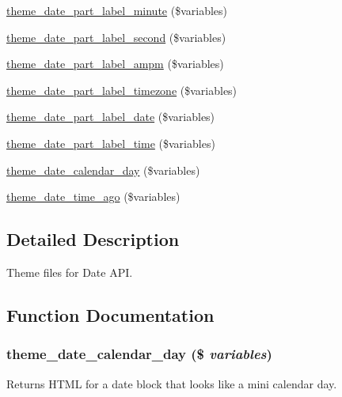 \begin{DoxyCompactItemize}
\item 
\hyperlink{date_2date__api_2theme_2theme_8inc_a20f7b09ea3d8c2ccba5a049d805a9aaf}{theme\_\-date\_\-part\_\-label\_\-minute} (\$variables)
\item 
\hyperlink{date_2date__api_2theme_2theme_8inc_a7419226ba21ee61300adf34a8643fdcf}{theme\_\-date\_\-part\_\-label\_\-second} (\$variables)
\item 
\hyperlink{date_2date__api_2theme_2theme_8inc_aaba84c834dc97a4061f1c671292c667a}{theme\_\-date\_\-part\_\-label\_\-ampm} (\$variables)
\item 
\hyperlink{date_2date__api_2theme_2theme_8inc_aabc76a71b185dd83c1ce683cfcc9494a}{theme\_\-date\_\-part\_\-label\_\-timezone} (\$variables)
\item 
\hyperlink{date_2date__api_2theme_2theme_8inc_a23db2f104fb903403c3a5798c1575a4f}{theme\_\-date\_\-part\_\-label\_\-date} (\$variables)
\item 
\hyperlink{date_2date__api_2theme_2theme_8inc_a500670b612ff5002ad37b42922cd847f}{theme\_\-date\_\-part\_\-label\_\-time} (\$variables)
\item 
\hyperlink{date_2date__api_2theme_2theme_8inc_a804f07fe10bc29a9d8c99312d5535e13}{theme\_\-date\_\-calendar\_\-day} (\$variables)
\item 
\hyperlink{date_2date__api_2theme_2theme_8inc_ab45fb9ecb0188793b4c4318f449294a0}{theme\_\-date\_\-time\_\-ago} (\$variables)
\end{DoxyCompactItemize}


\subsection{Detailed Description}
Theme files for Date API. 

\subsection{Function Documentation}
\hypertarget{date_2date__api_2theme_2theme_8inc_a804f07fe10bc29a9d8c99312d5535e13}{
\subsubsection[{theme\_\-date\_\-calendar\_\-day}]{\setlength{\rightskip}{0pt plus 5cm}theme\_\-date\_\-calendar\_\-day (\$ {\em variables})}}
\label{date_2date__api_2theme_2theme_8inc_a804f07fe10bc29a9d8c99312d5535e13}
Returns HTML for a date block that looks like a mini calendar day.

